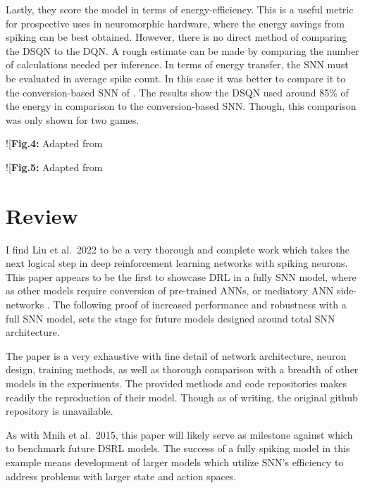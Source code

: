\documentclass[
]{article}
\begin{document}
Lastly, they score the model in terms of energy-efficiency. This is a
useful metric for prospective uses in neuromorphic hardware, where the
energy savings from spiking can be best obtained. However, there is no
direct method of comparing the DSQN to the DQN. A rough estimate can be
made by comparing the number of calculations needed per inference. In
terms of energy transfer, the SNN must be evaluated in average spike
count. In this case it was better to compare it to the conversion-based
SNN of \autocite{tanStrategyBenchmarkConverting2020}. The results show
the DSQN used around 85\% of the energy in comparison to the
conversion-based SNN. Though, this comparison was only shown for two
games.

!{[}\textbf{Fig.4:} Adapted from
\href{image-20230228103326947.png}{\autocite{liuHumanLevelControlDirectly2022}}

!{[}\textbf{Fig.5:} Adapted from
\href{image-20230228124237495.png}{\autocite{liuHumanLevelControlDirectly2022}}

\hypertarget{review}{%
\section{Review}\label{review}}

I find Liu et al.~2022 to be a very thorough and complete work which
takes the next logical step in deep reinforcement learning networks with
spiking neurons. This paper appears to be the first to showcase DRL in a
fully SNN model, where as other models require conversion of pre-trained
ANNs, or mediatory ANN side-networks
\autocite{chenDeepReinforcementLearning2022}. The following
proof of increased performance and robustness with a full SNN model,
sets the stage for future models designed around total SNN architecture.

The paper is a very exhaustive with fine detail of network architecture,
neuron design, training methods, as well as thorough comparison with a
breadth of other models in the experiments. The provided methods and
code repositories makes readily the reproduction of their model. Though
as of writing, the original github repository is unavailable.

As with Mnih et al.~2015, this paper will likely serve as milestone
against which to benchmark future DSRL models. The success of a fully
spiking model in this example means development of larger models which
utilize SNN's efficiency to address problems with larger state and
action spaces.
\end{document}
